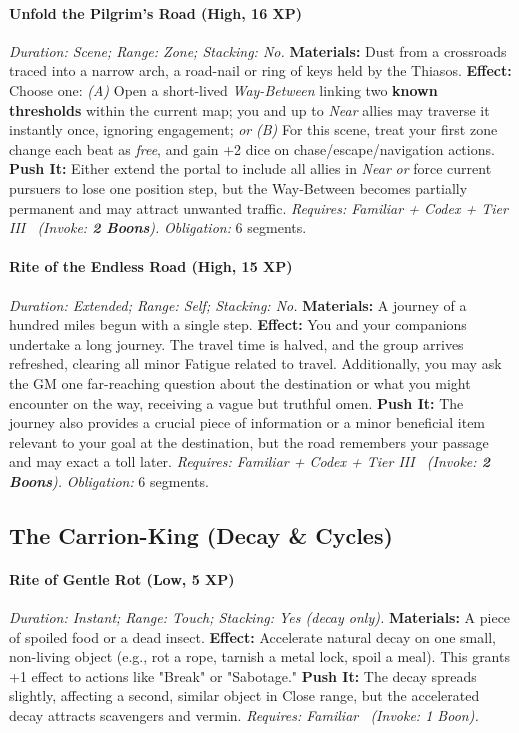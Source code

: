 \paragraph{Unfold the Pilgrim's Road (High, 16 XP)} \emph{Duration: Scene; Range: Zone; Stacking: No.}
\textbf{Materials:} Dust from a crossroads traced into a narrow arch, a road-nail or ring of keys held by the Thiasos.
\textbf{Effect:} Choose one:
\emph{(A)} Open a short-lived \emph{Way-Between} linking two \textbf{known thresholds} within the current map; you and up to \emph{Near} allies may traverse it instantly once, ignoring engagement; \emph{or}
\emph{(B)} For this scene, treat your first zone change each beat as \emph{free}, and gain +2 dice on chase/escape/navigation actions.
\textbf{Push It:} Either extend the portal to include all allies in \emph{Near} \emph{or} force current pursuers to lose one position step, but the Way-Between becomes partially permanent and may attract unwanted traffic.
\emph{Requires: Familiar + Codex + Tier III \ (\textit{Invoke:} \textbf{2 Boons}).}
\emph{Obligation:} 6 segments.

\paragraph{Rite of the Endless Road (High, 15 XP)} \emph{Duration: Extended; Range: Self; Stacking: No.}
\textbf{Materials:} A journey of a hundred miles begun with a single step.
\textbf{Effect:} You and your companions undertake a long journey. The travel time is halved, and the group arrives refreshed, clearing all minor Fatigue related to travel. Additionally, you may ask the GM one far-reaching question about the destination or what you might encounter on the way, receiving a vague but truthful omen.
\textbf{Push It:} The journey also provides a crucial piece of information or a minor beneficial item relevant to your goal at the destination, but the road remembers your passage and may exact a toll later.
\emph{Requires: Familiar + Codex + Tier III \ (\textit{Invoke:} \textbf{2 Boons}).}
\emph{Obligation:} 6 segments.

\subsection{The Carrion-King (Decay \& Cycles)}
\paragraph{Rite of Gentle Rot (Low, 5 XP)} \emph{Duration: Instant; Range: Touch; Stacking: Yes (decay only).}
\textbf{Materials:} A piece of spoiled food or a dead insect.
\textbf{Effect:} Accelerate natural decay on one small, non-living object (e.g., rot a rope, tarnish a metal lock, spoil a meal). This grants +1 effect to actions like "Break" or "Sabotage."
\textbf{Push It:} The decay spreads slightly, affecting a second, similar object in Close range, but the accelerated decay attracts scavengers and vermin.
\emph{Requires: Familiar \ (\textit{Invoke:} 1 Boon).}
